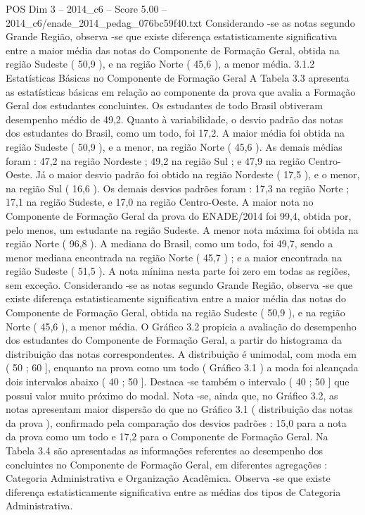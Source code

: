\begin{textsample}{POS Dim 3 – 2014\_c6 – Score 5.00 – 2014\_c6/enade\_2014\_pedag\_076bc59f40.txt}
Considerando -se as notas segundo Grande Região, observa -se que existe diferença estatisticamente significativa entre a maior média das notas do Componente de Formação Geral, obtida na região Sudeste ( 50,9 ), e na região Norte ( 45,6 ), a menor média. 3.1.2 Estatísticas Básicas no Componente de Formação Geral A Tabela 3.3 apresenta as estatísticas básicas em relação ao componente da prova que avalia a Formação Geral dos estudantes concluintes.
Os estudantes de todo Brasil obtiveram desempenho médio de 49,2.
Quanto à variabilidade, o desvio padrão das notas dos estudantes do Brasil, como um todo, foi 17,2.
A maior média foi obtida na região Sudeste ( 50,9 ), e a menor, na região Norte ( 45,6 ).
As demais médias foram : 47,2 na região Nordeste ; 49,2 na região Sul ; e 47,9 na região Centro-Oeste.
Já o maior desvio padrão foi obtido na região Nordeste ( 17,5 ), e o menor, na região Sul ( 16,6 ).
Os demais desvios padrões foram : 17,3 na região Norte ; 17,1 na região Sudeste, e 17,0 na região Centro-Oeste.
A maior nota no Componente de Formação Geral da prova do ENADE/2014 foi 99,4, obtida por, pelo menos, um estudante na região Sudeste.
A menor nota máxima foi obtida na região Norte ( 96,8 ).
A mediana do Brasil, como um todo, foi 49,7, sendo a menor mediana encontrada na região Norte ( 45,7 ) ; e a maior encontrada na região Sudeste ( 51,5 ).
A nota mínima nesta parte foi zero em todas as regiões, sem exceção.
Considerando -se as notas segundo Grande Região, observa -se que existe diferença estatisticamente significativa entre a maior média das notas do Componente de Formação Geral, obtida na região Sudeste ( 50,9 ), e na região Norte ( 45,6 ), a menor média.
O Gráfico 3.2 propicia a avaliação do desempenho dos estudantes do Componente de Formação Geral, a partir do histograma da distribuição das notas correspondentes.
A distribuição é unimodal, com moda em ( 50 ; 60 ], enquanto na prova como um todo ( Gráfico 3.1 ) a moda foi alcançada dois intervalos abaixo ( 40 ; 50 ].
Destaca -se também o intervalo ( 40 ; 50 ] que possui valor muito próximo do modal.
Nota -se, ainda que, no Gráfico 3.2, as notas apresentam maior dispersão do que no Gráfico 3.1 ( distribuição das notas da prova ), confirmado pela comparação dos desvios padrões : 15,0 para a nota da prova como um todo e 17,2 para o Componente de Formação Geral.
Na Tabela 3.4 são apresentadas as informações referentes ao desempenho dos concluintes no Componente de Formação Geral, em diferentes agregações : Categoria Administrativa e Organização Acadêmica.
Observa -se que existe diferença estatisticamente significativa entre as médias dos tipos de Categoria Administrativa.

\end{textsample}

